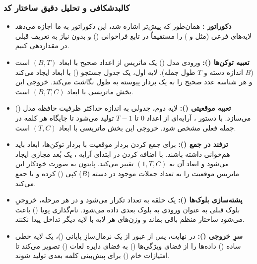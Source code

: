 \documentclass{article}
\begin{document}
\subsubsection*{کالبدشکافی و تحلیل دقیق ساختار کد}

\begin{itemize}
	\item \textbf{دکوراتور :} همان‌طور که پیش‌تر اشاره شد، این دکوراتور به ما اجازه می‌دهد لایه‌های فرعی (مثل  و ) را مستقیماً در تابع فراخوانی () و بدون نیاز به تعریف قبلی در  مقداردهی کنیم.
	
	\item \textbf{تعبیه توکن‌ها ():} ورودی مدل () یک ماتریس از اعداد صحیح با ابعاد $(B, T)$ است ($B$ اندازه دسته و $T$ طول جمله). لایه  اول، یک جدول جستجو () با ابعاد  ایجاد می‌کند و هر شناسه عدد صحیح را به یک بردار پیوسته به طول  نگاشت می‌کند. خروجی این بخش ماتریسی با ابعاد $(B, T, C)$ است.
	
	\item \textbf{تعبیه موقعیتی ():} لایه  دوم، جدولی به اندازه حداکثر ظرفیت حافظه مدل () می‌سازد. با دستور ، آرایه‌ای از اعداد $0$ تا $T-1$ تولید می‌شود تا جایگاه هر کلمه در جمله فعلی مشخص شود. خروجی این بخش ماتریسی با ابعاد $(T, C)$ است.
	
	\item \textbf{ترفند  در جمع ():} برای جمع کردن بردار موقعیت با بردار توکن‌ها، ابعاد باید هم‌خوانی داشته باشند. با اضافه کردن  در ابتدای آرایه ، یک بُعد مجازی ایجاد می‌شود و ابعاد آن به $(1, T, C)$ تغییر می‌کند. پایتون به صورت خودکار این ماتریس موقعیت را به تعداد جملات موجود در دسته ($B$) کپی () کرده و با  جمع می‌کند.
	
	\item \textbf{پشته‌سازی بلوک‌ها ():} یک حلقه  به تعداد  تکرار می‌شود و در هر مرحله، خروجیِ بلوک قبلی به عنوان ورودی به بلوک بعدی داده می‌شود. نام‌گذاری پویا () باعث می‌شود ساختار  منظم باقی بماند و وزن‌های هر لایه با لایه دیگر تداخل پیدا نکنند.
	
	\item \textbf{سرِ خروجی ():} در نهایت، پس از عبور از یک نرمال‌سازِ پایانی ()، یک لایه خطی ساده () داده‌ها را از فضای ویژگی‌ها () به فضای دایره لغات () تصویر می‌کند تا امتیازات خام () برای پیش‌بینی کلمه بعدی تولید شوند.
\end{itemize}
\end{document}
